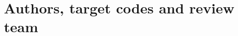 


\renewcommand{\longname}{Regridding and Interpolation }
\renewcommand{\funcname}{Regrid}
\renewcommand{\shortname}{RG}
\renewcommand{\myauthors}{Phil Jones, Mark Iredell, Will Sawyer}

\setcounter{section}{0}
\renewcommand{\thesection}{\arabic{section}}
\renewcommand{\thesubsection}{\arabic{section}.\arabic{subsection}}
\renewcommand{\thesubsubsection}{\arabic{section}.\arabic{subsection}.\arabic{subsubsection}}

%


%


\section{Authors, target codes and review team}

